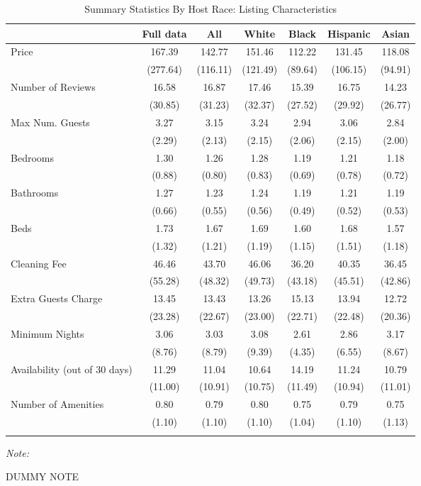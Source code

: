 \begin{table}[htbp]
\caption{Summary Statistics By Host Race: Listing Characteristics}
\begin{center}%
\small\begin{tabular}{l c c c c c c}
 & Full data & All & White & Black & Hispanic & Asian
\\
\hline\hline\noalign{\smallskip} 
 Price & 167.39 & 142.77 & 151.46 & 112.22 & 131.45 & 118.08 \\
 & (277.64) & (116.11) & (121.49) & (89.64) & (106.15) & (94.91) \\
 Number of Reviews & 16.58 & 16.87 & 17.46 & 15.39 & 16.75 & 14.23 \\
 & (30.85) & (31.23) & (32.37) & (27.52) & (29.92) & (26.77) \\
 Max Num. Guests & 3.27 & 3.15 & 3.24 & 2.94 & 3.06 & 2.84 \\
 & (2.29) & (2.13) & (2.15) & (2.06) & (2.15) & (2.00) \\
 Bedrooms & 1.30 & 1.26 & 1.28 & 1.19 & 1.21 & 1.18 \\
 & (0.88) & (0.80) & (0.83) & (0.69) & (0.78) & (0.72) \\
 Bathrooms & 1.27 & 1.23 & 1.24 & 1.19 & 1.21 & 1.19 \\
 & (0.66) & (0.55) & (0.56) & (0.49) & (0.52) & (0.53) \\
 Beds & 1.73 & 1.67 & 1.69 & 1.60 & 1.68 & 1.57 \\
 & (1.32) & (1.21) & (1.19) & (1.15) & (1.51) & (1.18) \\
 Cleaning Fee & 46.46 & 43.70 & 46.06 & 36.20 & 40.35 & 36.45 \\
 & (55.28) & (48.32) & (49.73) & (43.18) & (45.51) & (42.86) \\
 Extra Guests Charge & 13.45 & 13.43 & 13.26 & 15.13 & 13.94 & 12.72 \\
 & (23.28) & (22.67) & (23.00) & (22.71) & (22.48) & (20.36) \\
 Minimum Nights & 3.06 & 3.03 & 3.08 & 2.61 & 2.86 & 3.17 \\
 & (8.76) & (8.79) & (9.39) & (4.35) & (6.55) & (8.67) \\
 Availability (out of 30 days) & 11.29 & 11.04 & 10.64 & 14.19 & 11.24 & 10.79 \\
 & (11.00) & (10.91) & (10.75) & (11.49) & (10.94) & (11.01) \\
 Number of Amenities & 0.80 & 0.79 & 0.80 & 0.75 & 0.79 & 0.75 \\
 & (1.10) & (1.10) & (1.10) & (1.04) & (1.10) & (1.13) \\
\hline\hline\noalign{\smallskip} \end{tabular} 
\begin{minipage}{6in}
{\it Note:} \begin{center}DUMMY NOTE
\end{center}
\end{minipage}
\end{center}
\end{table}
